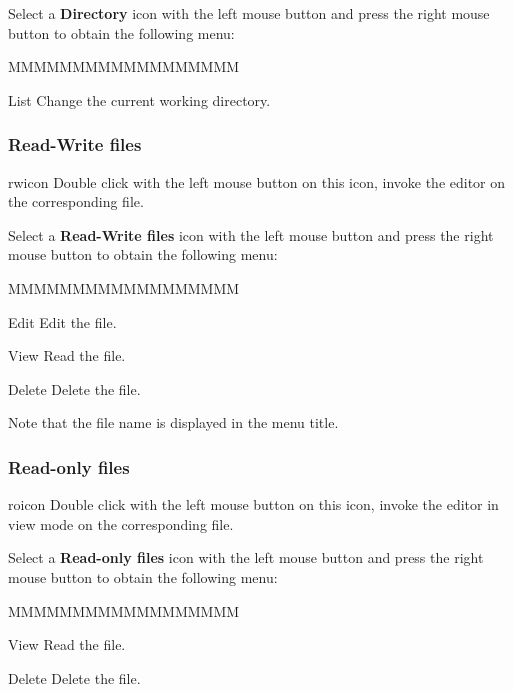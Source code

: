 Select a {\bf Directory} icon with the left mouse button and press
the right mouse button to obtain the following menu:


\begin{DLsf}{MMMMMMMMMMMMMMMMMM}
\item[List] Change the current working directory.
\end{DLsf}


\subsubsection{Read-Write files}
\begin{ICON}{rwicon}
Double click with the left mouse button on this icon, invoke the editor on the
corresponding file.
\end{ICON}

Select a {\bf Read-Write files} icon with the left mouse button and press
the right mouse button to obtain the following menu:


\begin{DLsf}{MMMMMMMMMMMMMMMMMM}
\item[Edit]         Edit the file.
\item[View]         Read the file.
\item[Delete]       Delete the file.
\end{DLsf}

Note that the file name is displayed in the menu title.


\subsubsection{Read-only files}
\begin{ICON}{roicon}
Double click with the left mouse button on this icon, invoke the editor in view
mode on the corresponding file.
\end{ICON}

Select a {\bf Read-only files} icon with the left mouse button and press
the right mouse button to obtain the following menu:


\begin{DLsf}{MMMMMMMMMMMMMMMMMM}
\item[View]         Read the file.
\item[Delete]       Delete the file.
\end{DLsf}

